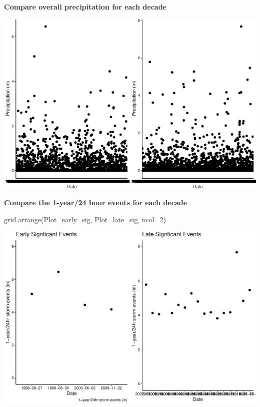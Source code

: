 \documentclass[
  12pt,
]{article}
\newenvironment{Shaded}{\begin{snugshade}}{\end{snugshade}}
\newcommand{\AttributeTok}[1]{\textcolor[rgb]{0.77,0.63,0.00}{#1}}
\newcommand{\DecValTok}[1]{\textcolor[rgb]{0.00,0.00,0.81}{#1}}
\newcommand{\FunctionTok}[1]{\textcolor[rgb]{0.00,0.00,0.00}{#1}}
\newcommand{\NormalTok}[1]{#1}
\begin{document}
\textbf{Compare overall precipitation for each decade}

\begin{center}\includegraphics{Final_Project_Thornton_Katayama_Ngenzi_files/figure-latex/unnamed-chunk-2-1} \end{center}

\textbf{Compare the 1-year/24 hour events for each decade}

\begin{Shaded}
\begin{Highlighting}[]
\FunctionTok{grid.arrange}\NormalTok{(Plot\_early\_sig, Plot\_late\_sig, }\AttributeTok{ncol=}\DecValTok{2}\NormalTok{)}
\end{Highlighting}
\end{Shaded}

\includegraphics{Final_Project_Thornton_Katayama_Ngenzi_files/figure-latex/combined one year storms-1.pdf}
\end{document}
